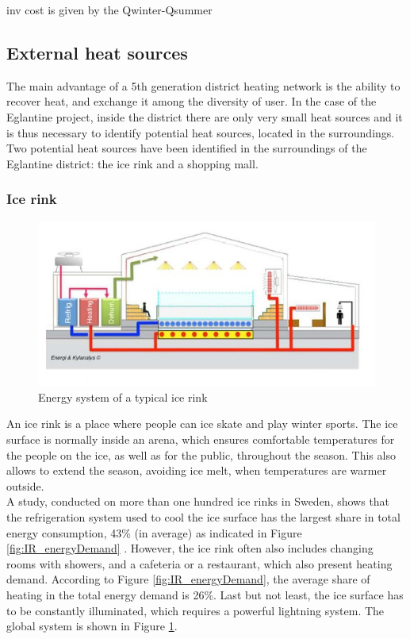 \documentclass{article}
\begin{document}
inv cost is given by the Qwinter-Qsummer
\subsection{External heat sources}
The main advantage of a 5th generation district heating network is the ability to recover heat, and exchange it among the diversity of user. In the case of the Eglantine project, inside the district there are only very small heat sources and it is thus necessary to identify potential heat sources, located in the surroundings. 
Two potential heat sources have been identified in the surroundings of the Eglantine district: the ice rink and a shopping mall.

\subsubsection{Ice rink}

\begin{figure}[htp]
	\centering
	\includegraphics[width=1\textwidth]{IR_schema.JPG}
	\caption{Energy system of a typical ice rink \cite{gronqvistComparativeLifecycleCost}}
	\label{fig:IR_schema}
\end{figure}

An ice rink is a place where people can ice skate and play winter sports. The ice surface is normally inside an arena, which ensures comfortable temperatures for the people on the ice, as well as for the public, throughout the season. This also allows to extend the season, avoiding ice melt, when temperatures are warmer outside.\\

A study, conducted on more than one hundred ice rinks in Sweden, shows that the refrigeration system used to cool the ice surface has the largest share in total energy consumption, 43\% (in average) as indicated in Figure \ref{fig:IR_energyDemand} \cite{karampourMEASUREMENTMODELLINGICE}. 
However, the ice rink often also includes changing rooms with showers, and a cafeteria or a restaurant, which also present heating demand. According to Figure \ref{fig:IR_energyDemand}, the average share of heating in the total energy demand is 26\%.
Last but not least, the ice surface has to be constantly illuminated, which requires a powerful lightning system. The global system is shown in Figure \ref{fig:IR_schema}.\\
\end{document}
